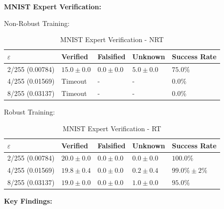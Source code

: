\documentclass[11pt,a4paper]{article}
\begin{document}
\textbf{MNIST Expert Verification:}

Non-Robust Training:

\begin{table}[H]
\centering
\begin{tabular}{lllll}
\toprule
$\varepsilon$ & Verified & Falsified & Unknown & Success Rate \\
\midrule
2/255 (0.00784) & $15.0 \pm 0.0$ & $0.0 \pm 0.0$ & $5.0 \pm 0.0$ & $75.0\%$ \\
4/255 (0.01569) & Timeout & - & - & 0.0\% \\
8/255 (0.03137) & Timeout & - & - & 0.0\% \\
\bottomrule
\end{tabular}
\caption{MNIST Expert Verification - NRT}
\end{table}

Robust Training:

\begin{table}[H]
\centering
\begin{tabular}{lllll}
\toprule
$\varepsilon$ & Verified & Falsified & Unknown & Success Rate \\
\midrule
2/255 (0.00784) & $20.0 \pm 0.0$ & $0.0 \pm 0.0$ & $0.0 \pm 0.0$ & $100.0\%$ \\
4/255 (0.01569) & $19.8 \pm 0.4$ & $0.0 \pm 0.0$ & $0.2 \pm 0.4$ & $99.0\% \pm 2\%$ \\
8/255 (0.03137) & $19.0 \pm 0.0$ & $0.0 \pm 0.0$ & $1.0 \pm 0.0$ & $95.0\%$ \\
\bottomrule
\end{tabular}
\caption{MNIST Expert Verification - RT}
\end{table}

\textbf{Key Findings:}
\end{document}

